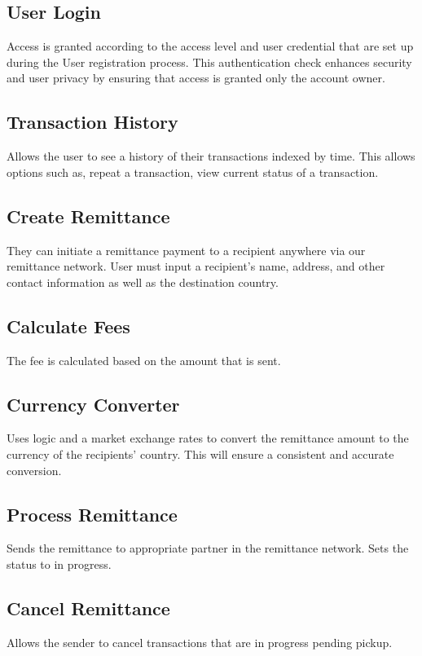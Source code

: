 \documentclass[onecolumn, letterpaper, ]{report}
\begin{document}
        \subsection{User Login} Access is granted according to the access level and user credential that are set up during the User registration process. This authentication check enhances security and user privacy by ensuring that access is granted only the account owner.

        \subsection{Transaction History} Allows the user to see a history of their transactions indexed by time. This allows options such as, repeat a transaction, view current status of a transaction.

        \subsection{Create Remittance} They can initiate a remittance payment to a recipient anywhere via our remittance network. User must input a recipient's name, address, and other contact information as well as the destination country. 

        \subsection{Calculate Fees} The fee is calculated based on the amount that is sent. 

        \subsection{Currency Converter} Uses logic and a market exchange rates to convert the remittance amount to the currency of the recipients' country. This will ensure a consistent and accurate conversion.

        \subsection{Process Remittance} Sends the remittance to appropriate partner in the remittance network. Sets the status to in progress.

        \subsection{Cancel Remittance} Allows the sender to cancel transactions that are in progress pending pickup. 
\end{document}
